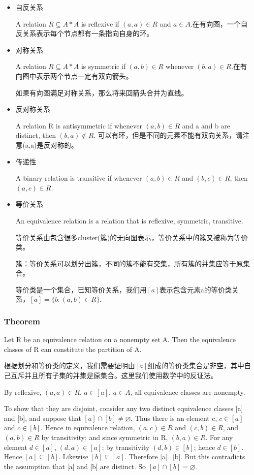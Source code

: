\documentclass[UTF8]{ctexart}
\begin{document}
\begin{itemize}
    \item 自反关系
    
    A relation $R \subseteq A*A$ is reflexive if $(a,a) \in R$ and $a \in A$.在有向图，一个自反关系表示每个节点都有一条指向自身的环。
    \item 对称关系
    
    A relation $R \subseteq A*A$ is symmetric if $(a,b) \in R$ whenever $(b,a) \in R$.在有向图中表示两个节点一定有双向箭头。

    如果有向图满足对称关系，那么将来回箭头合并为直线。
    \item 反对称关系
    
    A relation R is antisymmetric if whenever $(a,b) \in R$ and a and b are distinct, then $(b,a) \notin R$. 可以有环，但是不同的元素不能有双向关系，请注意(a,a)是反对称的。

    \item 传递性
    
    A binary relation is transitive if whenever $(a,b) \in R$ and $(b,c) \in R$, then $(a,c) \in R$.

    \item 等价关系
    
    An equivalence relation is a relation that is reflexive, symmetric, transitive. 

    等价关系由包含很多cluster(簇)的无向图表示，等价关系中的簇又被称为等价类。

    簇：等价关系可以划分出簇，不同的簇不能有交集，所有簇的并集应等于原集合。

    等价类是一个集合，已知等价关系，我们用$[a]$表示包含元素a的等价类关系，$[a] =\{b: (a, b) \in R\}$.


\end{itemize}

\subsubsection{Theorem}
Let R be an equivalence relation on a nonempty set A. Then the equivalence classes of R can constitute the partition of A.

根据划分和等价类的定义，我们需要证明由$[a]$组成的等价类集合是非空，其中自己互斥并且所有子集的并集是原集合。这里我们使用数学中的反证法。

By reflexive, $(a,a) \in R $, $a \in [a] $, $a \in A$, all equivalence classes are nonempty.

To show that they are disjoint, consider any two distinct equivalence classes [a] and [b], and suppose that $[a] \cap [b] \neq \varnothing $. Thus there is an element c, $c \in [a]$ and $c \in [b]$. Hence in equivalence relation, $(a,c) \in R$ and $(c,b) \in R$, and $(a,b) \in R$ by transitivity; and since symmetric in R, $(b,a) \in R$. For any element $d \in [a]$, $(d,a) \in [a]$; by transitivity $(d,b) \in [b]$; hence $d \in [b]$. Hence $[a] \subseteq [b]$. Likewise $[b] \subseteq [a]$. Therefore [a]=[b]. But this contradicts the assumption that [a] and [b] are distinct. So $[a] \cap [b] = \varnothing$.
\end{document}
